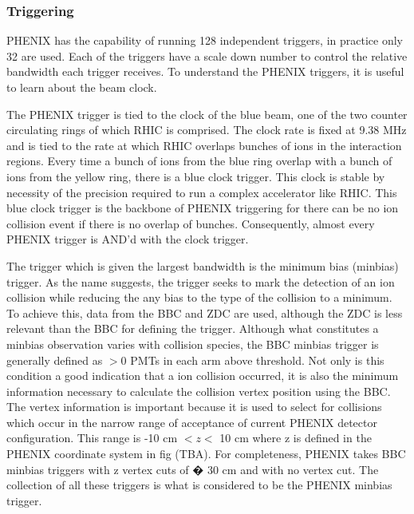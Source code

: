 \subsubsection{Triggering}
PHENIX has the capability of running 128 independent triggers, in practice only 32 are used. Each of the triggers have a scale down number to control the relative bandwidth each trigger receives. To understand the PHENIX triggers, it is useful to learn about the beam clock.

The PHENIX trigger is tied to the clock of the blue beam, one of the two counter circulating rings of which RHIC is comprised. The clock rate is fixed at 9.38 MHz and is tied to the rate at which RHIC overlaps bunches of ions in the interaction regions. Every time a bunch of ions from the blue ring overlap with a bunch of ions from the yellow ring, there is a blue clock trigger. This clock is stable by necessity of the precision required to run a complex accelerator like RHIC. This blue clock trigger is the backbone of PHENIX triggering for there can be no ion collision event if there is no overlap of bunches. Consequently, almost every PHENIX trigger is AND'd with the clock trigger.

The trigger which is given the largest bandwidth is the minimum bias (minbias) trigger. As the name suggests, the trigger seeks to mark the detection of an ion collision while reducing the any bias to the type of the collision to a minimum. To achieve this, data from the BBC and ZDC are used, although the ZDC is less relevant than the BBC for defining the trigger. Although what constitutes a minbias observation varies with collision species, the BBC minbias trigger is generally defined as $>$0 PMTs in each arm above threshold. Not only is this condition a good indication that a ion collision occurred, it is also the minimum information necessary to calculate the collision vertex position using the BBC. The vertex information is important because it is used to select for collisions which occur in the narrow range of acceptance of current PHENIX detector configuration. This range is -10 cm $< z<$ 10 cm where z is defined in the PHENIX coordinate system in fig (TBA). For completeness, PHENIX takes BBC minbias triggers with z vertex cuts of � 30 cm and with no vertex cut. The collection of all these triggers is what is considered to be the PHENIX minbias trigger.


